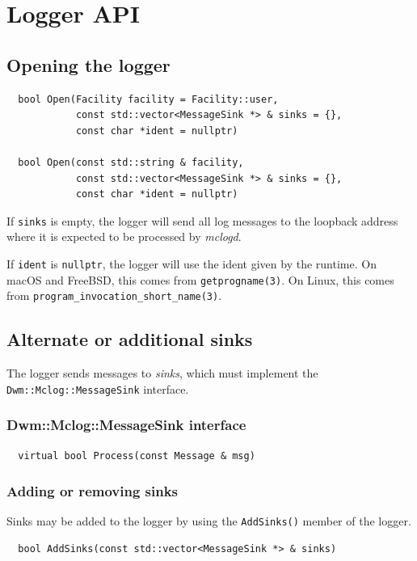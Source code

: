 \chapter{Logger API}

\section{Opening the logger}

\begin{verbatim}
  bool Open(Facility facility = Facility::user,
            const std::vector<MessageSink *> & sinks = {},
            const char *ident = nullptr)

  bool Open(const std::string & facility,
            const std::vector<MessageSink *> & sinks = {},
            const char *ident = nullptr)
\end{verbatim}

If \texttt{sinks} is empty, the logger will send all log messages
to the loopback address where it is expected to be processed by
\textit{mclogd}.

If \texttt{ident} is \texttt{nullptr}, the logger will use the ident
given by the runtime.  On macOS and FreeBSD, this comes from
\texttt{getprogname(3)}.  On Linux, this comes from
\texttt{program\_invocation\_short\_name(3)}.

\section{Alternate or additional sinks}
The logger sends messages to \textit{sinks}, which must implement
the \texttt{Dwm::Mclog::MessageSink} interface.

\subsection{Dwm::Mclog::MessageSink interface}
\begin{verbatim}
  virtual bool Process(const Message & msg)
\end{verbatim}

\subsection{Adding or removing sinks}
Sinks may be added to the logger by using the \texttt{AddSinks()}
member of the logger.

\begin{verbatim}
  bool AddSinks(const std::vector<MessageSink *> & sinks)
\end{verbatim}

